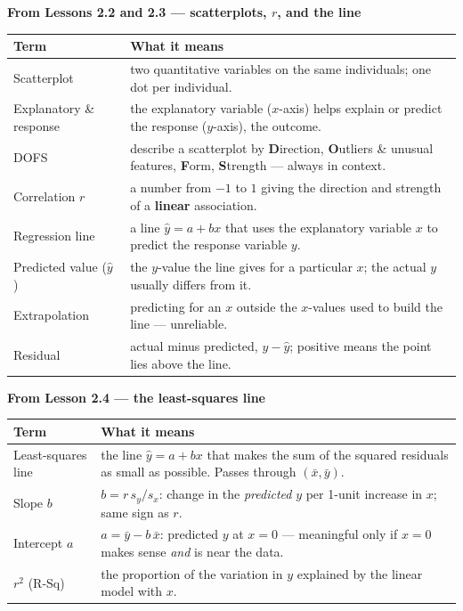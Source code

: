\documentclass[12pt]{article}
\begin{document}
\vspace{7pt}
\boxguard[9]
\textbf{From Lessons 2.2 and 2.3 --- scatterplots, $r$, and the line}
\par\vspace{3pt}
\noindent\begin{tabularx}{\linewidth}{@{} l X @{}}
\rowcolor{sky}
\textbf{Term} & \textbf{What it means} \\
\midrule
Scatterplot & two quantitative variables on the same individuals; one dot per individual. \\
Explanatory \& response & the explanatory variable ($x$-axis) helps explain or predict the
                   response ($y$-axis), the outcome. \\
DOFS & describe a scatterplot by \textbf{D}irection, \textbf{O}utliers \& unusual features,
                   \textbf{F}orm, \textbf{S}trength --- always in context. \\
Correlation $r$ & a number from $-1$ to $1$ giving the direction and strength of a
                   \textbf{linear} association. \\
Regression line & a line $\hat{y}=a+bx$ that uses the explanatory variable $x$ to predict the
                   response variable $y$. \\
Predicted value ($\hat{y}$) & the $y$-value the line gives for a particular $x$; the actual
                   $y$ usually differs from it. \\
Extrapolation & predicting for an $x$ outside the $x$-values used to build the line --- unreliable. \\
Residual & actual minus predicted, $y-\hat{y}$; positive means the point lies above the line. \\
\end{tabularx}

\vspace{7pt}
\boxguard[9]
\textbf{From Lesson 2.4 --- the least-squares line}
\par\vspace{3pt}
\noindent\begin{tabularx}{\linewidth}{@{} l X @{}}
\rowcolor{sky}
\textbf{Term} & \textbf{What it means} \\
\midrule
Least-squares line & the line $\hat y = a + bx$ that makes the sum of the squared residuals as
                   small as possible. Passes through $(\bar x, \bar y)$. \\
Slope $b$ & $b = r\,s_y/s_x$: change in the \emph{predicted} $y$ per 1-unit increase
                   in $x$; same sign as $r$. \\
Intercept $a$ & $a = \bar y - b\,\bar x$: predicted $y$ at $x = 0$ --- meaningful only if
                   $x = 0$ makes sense \emph{and} is near the data. \\
$r^2$ (R-Sq) & the proportion of the variation in $y$ explained by the linear model with $x$. \\
\end{tabularx}
\end{document}
